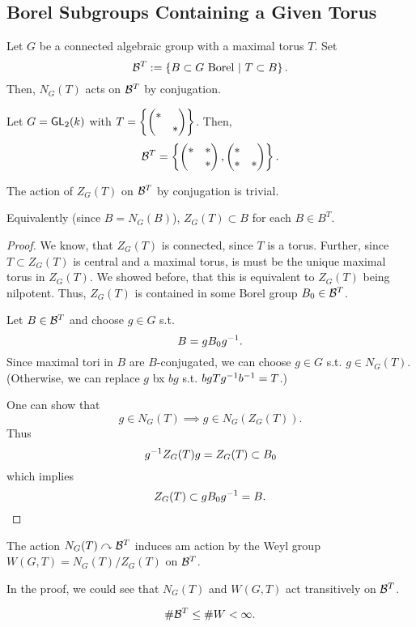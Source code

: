 \subsection{Borel Subgroups Containing a Given Torus}

Let $G$ be a connected algebraic group with a maximal torus $T$. Set
\[ \mathcal{B}^T := \left\lbrace B \subset G \text{ Borel} ~ | ~ T \subset B\right\rbrace. \]
Then, $N_G(T)$ acts on $\mathcal{B}^T$ by conjugation.
\begin{example}
Let $G = \textsf{GL}_2(k)$ with $T = \left\lbrace\left(\begin{matrix} * & \\ & * \end{matrix}\right)\right\rbrace$. Then,
\[ \mathcal{B}^T = \left\lbrace \left(\begin{matrix} * & *\\ & * \end{matrix}\right), \left(\begin{matrix} * & \\ * & * \end{matrix}\right) \right\rbrace. \]
\end{example}

\begin{lemma}
	The action of $Z_G(T)$ on $\mathcal{B}^T$ by conjugation is trivial.
	
	Equivalently (since $B = N_G(B)$), $Z_G(T) \subset B$ for each $B \in B^T$.
\end{lemma}
\begin{proof}
	We know, that $Z_G(T)$ is connected, since $T$ is a torus. Further, since $T \subset Z_G(T)$ is central and a maximal torus, is must be the unique maximal torus in $Z_G(T)$.
	We showed before, that this is equivalent to $Z_G(T)$ being nilpotent. Thus, $Z_G(T)$ is contained in some Borel group $B_0 \in \mathcal{B}^T$.
	
	Let $B \in \mathcal{B}^T$ and choose $g \in G$ s.t.
	\[ B = gB_0g^{-1}. \]
	Since maximal tori in $B$ are $B$-conjugated, we can choose $g \in G$ s.t. $g \in N_G(T)$.
	(Otherwise, we can replace $g$ bx $bg$ s.t. $bgTg^{-1} b^{-1} = T$.)
	
	One can show that
	\[ g \in N_G(T) \implies g \in N_G(Z_G(T)). \]
	Thus
	\[g^{-1} Z_G(T) g = Z_G(T) \subset B_0 \]
	which implies
	\[ Z_G(T) \subset gB_0g^{-1} = B. \]
\end{proof}
\begin{corollary}
	The action $N_G(T) \curvearrowright \mathcal{B}^T$ induces am action by the Weyl group $W(G,T) = N_G(T) / Z_G(T)$ on $\mathcal{B}^T$.
\end{corollary}
\begin{corollary}
	In the proof, we could see that $N_G(T)$ and $W(G,T)$ act transitively on $\mathcal{B}^T$.
\end{corollary}
\begin{corollary}
	\[ \# \mathcal{B}^T \leq \# W < \infty. \]
\end{corollary}


